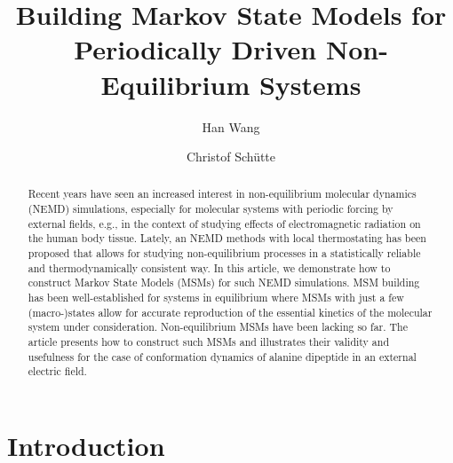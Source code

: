 \documentclass[aps, pre, preprint,unsortedaddress,a4paper,onecolumn,showkeys]{revtex4}
\begin{document}
\title{Building Markov State Models for Periodically Driven Non-Equilibrium Systems}
\author{Han Wang}
\author{Christof Sch\"utte}
   
\begin{abstract}
Recent years have seen an increased interest in non-equilibrium molecular dynamics (NEMD) simulations, especially for molecular systems with periodic forcing by external fields, e.g., in the context of studying  effects of electromagnetic radiation on the human body tissue. Lately, an NEMD methods with local thermostating has been proposed that allows for studying 
non-equilibrium processes in a statistically reliable and thermodynamically consistent way. In this article, we demonstrate how to construct Markov State Models (MSMs) for such NEMD simulations. MSM building has been well-established for systems in equilibrium where MSMs with just a few (macro-)states allow for accurate reproduction of the essential kinetics of the molecular system under consideration. Non-equilibrium MSMs have been lacking so far. The article presents how to construct such MSMs and illustrates their validity and usefulness for the case of conformation dynamics of alanine dipeptide in an external electric field.  
\end{abstract}



\maketitle

\section{Introduction}
\end{document}
